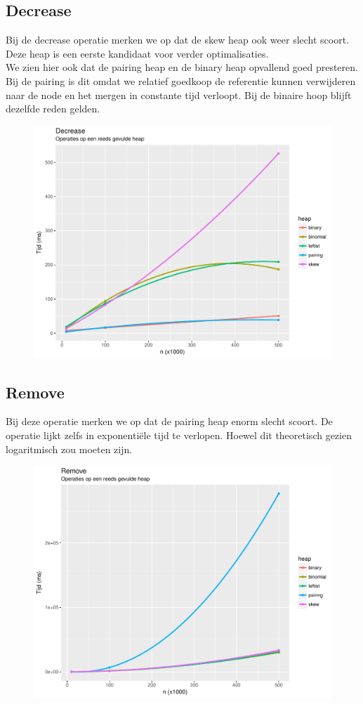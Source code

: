 \documentclass[a4paper,12pt]{report}
\begin{document}
\subsection{Decrease}
Bij de decrease operatie merken we op dat de skew heap ook weer slecht scoort. Deze heap is een eerste kandidaat voor verder optimalisaties. \\
We zien hier ook dat de pairing heap en de binary heap opvallend goed presteren. Bij de pairing is dit omdat we relatief goedkoop de referentie kunnen verwijderen naar de node en het mergen in constante tijd verloopt. Bij de binaire hoop blijft dezelfde reden gelden.
\begin{figure}[H]
	\includegraphics[scale=0.9]{grafieken/decrease}
\end{figure}
\subsection{Remove}
Bij deze operatie merken we op dat de pairing heap enorm slecht scoort. De operatie lijkt zelfs in exponenti\"ele tijd te verlopen. Hoewel dit theoretisch gezien logaritmisch zou moeten zijn.
\begin{figure}[H]
	\includegraphics[scale=0.9]{grafieken/remove}
\end{figure}
\end{document}
